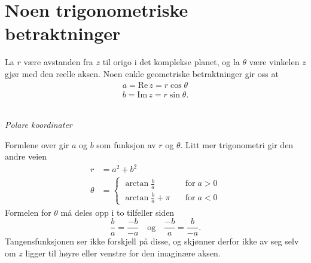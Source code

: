 \section*{Noen trigonometriske betraktninger}
La $r$ være avstanden fra $z$ til origo i det komplekse planet, 
og la $\theta$ være vinkelen $z$ gjør med den reelle aksen. 
Noen enkle geometriske betraktninger gir oss at 
\begin{align*}
a=\text{Re}\, z = r\cos \theta \\
b=\text{Im}\, z = r\sin \theta.
\end{align*}
\begin{center}
\\
{\small \textit{Polare koordinater}}
\end{center}
Formlene over gir $a$ og $b$ som funksjon av $r$ og $\theta$. 
Litt mer trigonometri gir den andre veien
\begin{align*}
r&=a^2+b^2 \\
\theta&= \begin{cases} \arctan \frac{b}{a} \quad &\text{for}\; a>0\\ \arctan \frac{b}{a} + \pi \quad &\text{for}\;  a<0 \end{cases}
\end{align*}
Formelen for $\theta$ må deles opp i to tilfeller siden
\[
\frac{b}{a}=\frac{-b}{-a} \quad \text{og} \quad \frac{-b}{a}=\frac{b}{-a}.
\]
 Tangensfunksjonen ser ikke forskjell på disse, 
 og skjønner derfor ikke av seg selv om $z$ ligger til høyre eller venstre for den imaginære aksen. 
 

